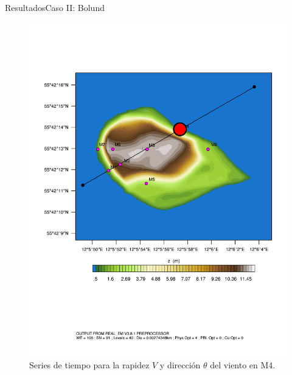 \documentclass[mathserif,10pt]{beamer}
\begin{document}
\begin{frame}{Resultados}{Caso II: Bolund}
\begin{figure}[H]
\begin{minipage}{0.35\linewidth}
		\includegraphics[width=1\linewidth,page=1,trim={3.5cm 9.3cm 0.8cm 3.8cm},clip]{fig/05/ppt/bol_control_point4.pdf}%
	\end{minipage}%
		\vspace{-2mm}\caption{Series de tiempo para la rapidez $V$ y dirección $\theta$ del viento en M4.}
		\label{fig:06_bol_ts_m4}
	\end{figure}
\end{frame}
\end{document}

